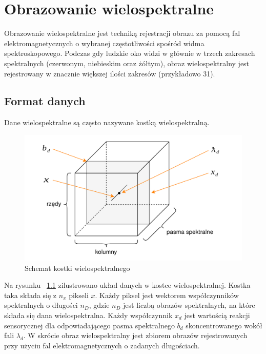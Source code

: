 
\chapter{Obrazowanie wielospektralne}
Obrazowanie wielospektralne jest techniką rejestracji obrazu za pomocą fal elektromagnetycznych o wybranej częstotliwości spośród widma spektroskopowego. Podczas gdy ludzkie oko widzi w głównie w trzech zakresach spektralnych (czerwonym, niebieskim oraz żółtym), obraz wielospektralny jest rejestrowany w znacznie większej ilości zakresów (przykładowo 31).

\section{Format danych}
Dane wielospektralne są często nazywane kostką wielospektralną. 

\begin{figure}[ht]
	\centering
		\includegraphics[width=0.75\linewidth]{rys02/multispectral-cube-vector}
	\caption{Schemat kostki wielospektralnego}
	\label{fig:multispectral-cube}	
\end{figure}

Na rysunku ~\ref{fig:multispectral-cube} zilustrowano układ danych w kostce wielospektralnej. Kostka taka składa się z $n_x$ pikseli $x$. Każdy piksel jest wektorem współczynników spektralnych o długości  $n_D$, gdzie $n_D$ jest liczbą obrazów spektralnych, na które składa się dana wielospektralna. Każdy współczynnik $x_d$ jest wartością reakcji sensorycznej dla odpowiadającego pasma spektralnego $b_d$ skoncentrowanego wokół fali $\lambda_d$. W skrócie obraz wielospektralny jest zbiorem obrazów rejestrowanych przy użyciu fal elektromagnetycznych o zadanych długościach. 


